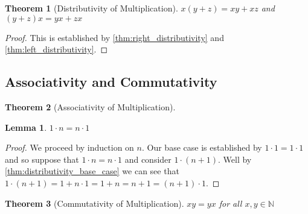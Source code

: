 \documentclass{article}
\theoremstyle{definition}
\theoremstyle{definition}
\theoremstyle{plain}
\theoremstyle{remark}
\theoremstyle{plain}
\newtheorem{theorem}{Theorem}[section]
\theoremstyle{remark}
\theoremstyle{plain}
\newtheorem{lemma}{Lemma}[section]
\theoremstyle{plain}
\theoremstyle{plain}
\theoremstyle{plain}
\begin{document}
\begin{theorem}[Distributivity of Multiplication]
  \(x(y + z) = xy + xz \) and \( (y+z)x = yx + zx \) 
\end{theorem}

\begin{proof}
  This is established by \autoref{thm:right_distributivity} and
  \autoref{thm:left_distributivity}. 
\end{proof}

\subsection{Associativity and Commutativity}


\begin{theorem}[Associativity of Multiplication]
  
\end{theorem}

\begin{lemma}
  \( 1 \cdot n = n \cdot 1 \)
  \label{thm:distributivity_base_case_lemma}
\end{lemma}

\begin{proof}
  We proceed by induction on \( n \). Our base case is established by 
  \( 1 \cdot 1 = 1 \cdot 1\) and so suppose that \( 1 \cdot n = n \cdot 1 \) and
  consider \( 1 \cdot (n + 1) \). Well by \autoref{thm:distributivity_base_case}
  we can see that 
  \( 1 \cdot (n + 1) = 1 + n \cdot 1 = 1 + n = n + 1 = (n + 1) \cdot 1 \).
\end{proof}

\begin{theorem}[Commutativity of Multiplication]
  \( xy = yx \) for all \( x, y \in \mathbb{N} \) 
\end{theorem}



\end{document}
